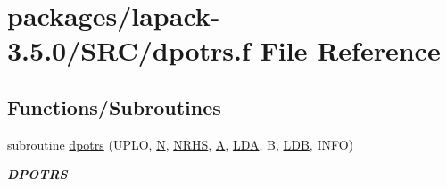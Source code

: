 \hypertarget{dpotrs_8f}{}\section{packages/lapack-\/3.5.0/\+S\+R\+C/dpotrs.f File Reference}
\label{dpotrs_8f}
\subsection*{Functions/\+Subroutines}
\begin{DoxyCompactItemize}
\item 
subroutine \hyperlink{group__doublePOcomputational_ga167aa0166c4ce726385f65e4ab05e7c1}{dpotrs} (U\+P\+L\+O, \hyperlink{polmisc_8c_a0240ac851181b84ac374872dc5434ee4}{N}, \hyperlink{example__user_8c_aa0138da002ce2a90360df2f521eb3198}{N\+R\+H\+S}, \hyperlink{classA}{A}, \hyperlink{example__user_8c_ae946da542ce0db94dced19b2ecefd1aa}{L\+D\+A}, B, \hyperlink{example__user_8c_a50e90a7104df172b5a89a06c47fcca04}{L\+D\+B}, I\+N\+F\+O)
\begin{DoxyCompactList}\small\item\em {\bfseries D\+P\+O\+T\+R\+S} \end{DoxyCompactList}\end{DoxyCompactItemize}
